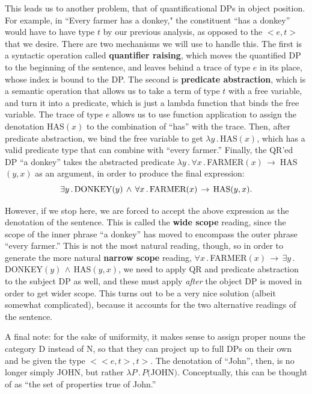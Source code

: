 \documentclass[11pt, oneside]{article}      %
\begin{document}
This leads us to another problem, that of quantificational DPs in object position.  For example, in ``Every farmer has a donkey," the constituent ``has a donkey'' would have to have type $t$ by our previous analysis, as opposed to the ${<}e, t{>}$ that we desire.  There are two mechanisms we will use to handle this.  The first is a syntactic operation called \textbf{quantifier raising}, which moves the quantified DP to the beginning of the sentence, and leaves behind a trace of type $e$ in its place, whose index is bound to the DP.  The second is \textbf{predicate abstraction}, which is a semantic operation that allows us to take a term of type $t$ with a free variable, and turn it into a predicate, which is just a lambda function that binds the free variable.  The trace of type $e$ allows us to use function application to assign the denotation HAS$(x)$ to the combination of ``has'' with the trace.  Then, after predicate abstraction, we bind the free variable to get $\lambda y \, . \, $HAS$(x)$, which has a valid predicate type that can combine with ``every farmer.''  Finally, the QR'ed DP ``a donkey'' takes the abstracted predicate $\lambda y \, . \, \forall x \, . \, $FARMER$(x) \, \rightarrow \; $HAS$(y, x)$ as an argument, in order to produce the final expression:
$$
\exists y \, . \, \textnormal{DONKEY}(y) \, \wedge \, \forall x \, . \, \textnormal{FARMER}(x) \, \rightarrow \, \textnormal{HAS}(y, x).
$$

However, if we stop here, we are forced to accept the above expression as the denotation of the sentence.  This is called the \textbf{wide scope} reading, since the scope of the inner phrase ``a donkey'' has moved to encompass the outer phrase ``every farmer.''  This is not the most natural reading, though, so in order to generate the more natural \textbf{narrow scope} reading, $\forall x \, . \, $FARMER$(x) \, \rightarrow \, \exists y \, . \, $DONKEY$(y) \, \wedge \, $HAS$(y, x)$, we need to apply QR and predicate abstraction to the subject DP as well, and these must apply \textit{after} the object DP is moved in order to get wider scope.  This turns out to be a very nice solution (albeit somewhat complicated), because it accounts for the two alternative readings of the sentence.

A final note: for the sake of uniformity, it makes sense to assign proper nouns the category D instead of N, so that they can project up to full DPs on their own and be given the type ${<}{<}e, t{>}, t{>}$.  The denotation of ``John'', then, is no longer simply JOHN, but rather $\lambda P \, . \, P($JOHN$)$.  Conceptually, this can be thought of as ``the set of properties true of John.''
\end{document}
